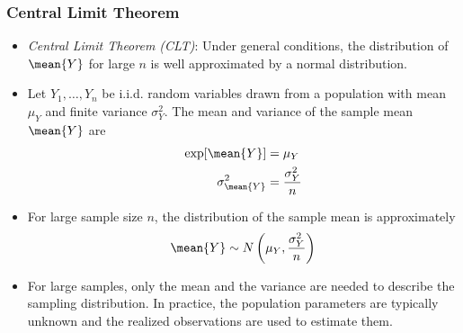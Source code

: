 

\begin{frame}
\frametitle{Central Limit Theorem}
\begin{itemize}
\item \emph{Central Limit Theorem (CLT)}: Under general conditions, the distribution of $\mean{Y}$ for large $n$ is well approximated by a normal distribution. 
\item Let $Y_1,\ldots,Y_n$ be i.i.d. random variables drawn from a population with mean $\mu_Y$ and finite variance $\sigma_{Y}^2$. The mean and variance of the sample mean $\mean{Y}$ are
\begin{align*}
\exp[\mean{Y}] 
  & = \mu_Y \\
\sigma_{\mean{Y}}^2 
  & = \frac{\sigma_Y^2}{n}
\end{align*}
\item For large sample size $n$, the distribution of the sample mean is approximately
\begin{align*}
\mean{Y} \sim N\left(\mu_Y, \frac{\sigma_Y^2}{n}\right)
\end{align*}
\item For large samples, only the mean and the variance are needed to describe the sampling distribution. In practice, the population parameters are typically unknown and the realized observations are used to estimate them. 
\end{itemize}
\end{frame}
